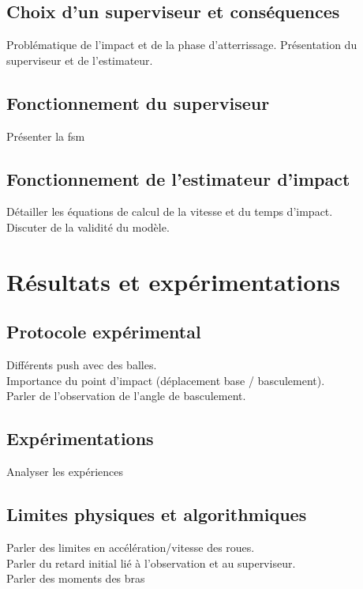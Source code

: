\subsection{Choix d'un superviseur et conséquences}

Problématique de l'impact et de la phase d'atterrissage.
Présentation du superviseur et de l'estimateur.

\subsection{Fonctionnement du superviseur}

Présenter la fsm

\subsection{Fonctionnement de l'estimateur d'impact}

Détailler les équations de calcul de la vitesse et du temps d'impact.\\
Discuter de la validité du modèle.

\section{Résultats et expérimentations}
\subsection{Protocole expérimental}

Différents push avec des balles.\\
Importance du point d'impact (déplacement base / basculement).\\
Parler de l'observation de l'angle de basculement.

\subsection{Expérimentations}

Analyser les expériences

\subsection{Limites physiques et algorithmiques}

Parler des limites en accélération/vitesse des roues.\\
Parler du retard initial lié à l'observation et au superviseur.\\
Parler des moments des bras


